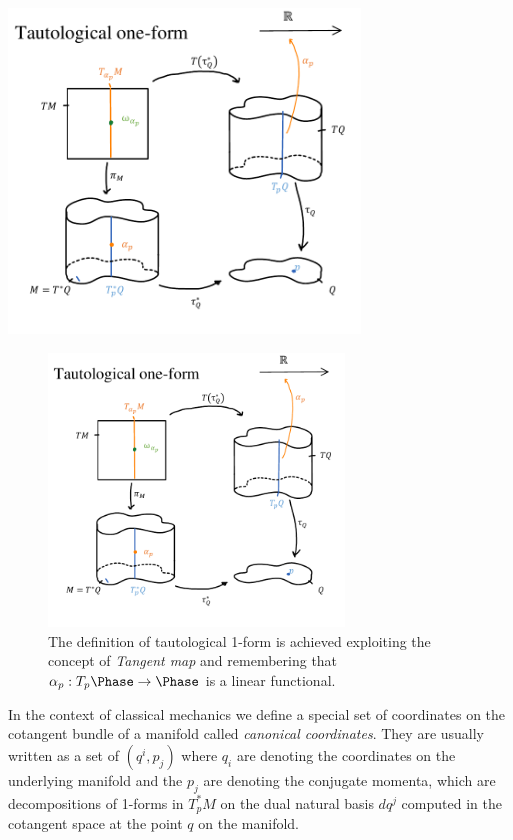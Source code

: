 \documentclass[Main]{subfiles}
\begin{document}
\ifToninus
					\begin{mdframed}
					  	\centering
   						\includegraphics[width=0.7\textwidth]{Pictures/Tautological1Form}
					\end{mdframed}
\else
					\begin{figure}[h!]
					  	\centering
   						\includegraphics[width=0.7\textwidth]{Pictures/Tautological1Form}
 						\caption{The definition of tautological 1-form is achieved exploiting the concept of \emph{Tangent map} and remembering that $\alpha_p: T_p \Phase \rightarrow \Phase$ is a linear functional.}
					\end{figure}
\fi

						In the context of classical mechanics we define a  special set of coordinates on the cotangent bundle of a manifold called \emph{canonical coordinates}.
						They are usually written as a set of $(q^i,p_j)$ where ${q_i}$ are denoting the coordinates on the underlying manifold and the ${p_j}$ are denoting the conjugate momenta, which are decompositions of 1-forms in $T_p^*M$ on the dual natural basis $d q^j$ computed in the cotangent space at the point $q$ on the manifold.
\end{document}
